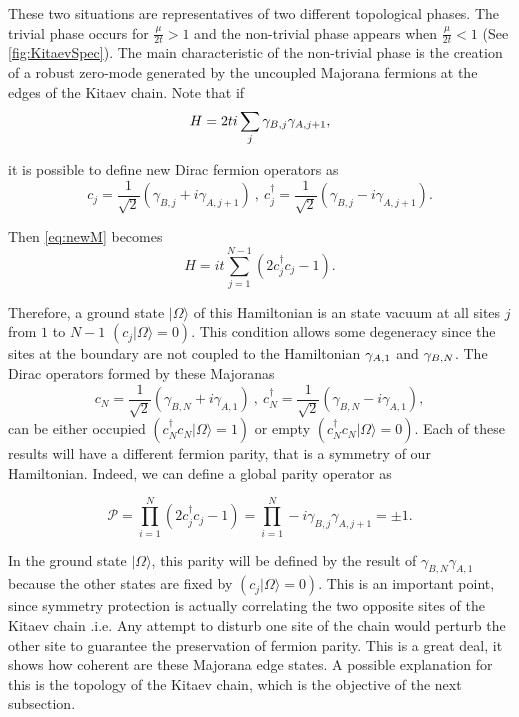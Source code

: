These two situations are representatives of two different topological phases. The trivial phase occurs for $\frac{\mu}{2t}>1$ and the non-trivial phase appears when $\frac{\mu}{2t}<1$ (See \ref{fig:KitaevSpec}). The main characteristic of the non-trivial phase  is the creation of a robust zero-mode generated by the  uncoupled Majorana fermions at the edges of the Kitaev chain. Note that if
\begin{equation}
H = 2ti\sum_{j}  \gamma_{B,j}\gamma_{A,j+1}, \label{eq:newM} 
\end{equation}
  
\noindent it is possible to define new Dirac fermion operators as 
$$c_j = \frac{1}{\sqrt{2}} \left( \gamma_{B,j}+ i\gamma_{A,j+1} \right) \ , \ c^\dagger_j = \frac{1}{\sqrt{2}} \left( \gamma_{B,j}- i\gamma_{A,j+1} \right). $$

\noindent Then \eqref{eq:newM} becomes 
\begin{equation}
H = it\sum_{j=1}^{N-1} \left(  2c^\dagger_jc_j-1 \right). \label{eq:newM2} 
\end{equation}

Therefore, a ground state $\vert \Omega \rangle$ of this Hamiltonian is an state vacuum at all sites $j$ from $1$ to $N-1$ $(c_j\vert \Omega \rangle = 0)$. This condition allows some degeneracy since the sites at the boundary are not coupled to the Hamiltonian $\gamma_{A,1}$ and $\gamma_{B,N}$. The Dirac  operators formed by these Majoranas 
$$c_N = \frac{1}{\sqrt{2}} \left( \gamma_{B,N}+ i\gamma_{A,1} \right) \ , \ c^\dagger_N = \frac{1}{\sqrt{2}} \left( \gamma_{B,N}- i\gamma_{A,1} \right), $$ 
can be either occupied $(c^\dagger_N c_N \vert \Omega \rangle = 1)$ or empty $(c^\dagger_N c_N \vert \Omega \rangle = 0)$. Each of these results will have a different fermion parity, that is a  symmetry of our Hamiltonian.   Indeed, we can define a global parity operator as 

\begin{equation}
    \mathcal{P} =\prod_{i = 1}^N\left(  2c^\dagger_jc_j-1 \right) = \prod_{i = 1}^N -i\gamma_{B,j}\gamma_{A,j+1}= \pm 1. 
\end{equation}

In the ground state $\vert \Omega \rangle$, this parity will be  defined by the result of  $\gamma_{B,N}\gamma_{A,1}$ because the other states are fixed by $(c_j\vert \Omega \rangle = 0)$. This is an important point, since  symmetry protection is actually correlating the two opposite sites of the Kitaev chain .i.e. Any attempt to disturb one site of the chain would perturb the other site to guarantee the preservation of fermion parity.  This is a great deal,  it shows how coherent are these Majorana edge states. A possible explanation for this is the topology of the Kitaev chain, which is the objective of the next subsection.

